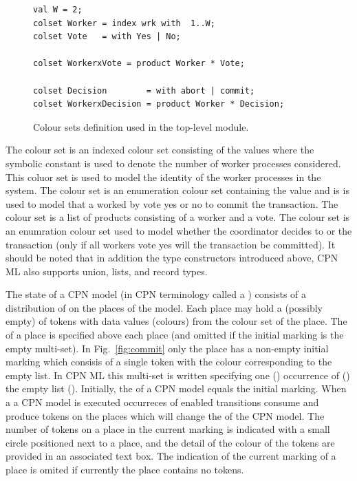 \begin{figure}
\begin{verbatim}
val W = 2;
colset Worker = index wrk with  1..W;
colset Vote   = with Yes | No;

colset WorkerxVote = product Worker * Vote;

colset Decision        = with abort | commit;
colset WorkerxDecision = product Worker * Decision;
\end{verbatim}
\caption{Colour sets definition used in the top-level module.}
\end{figure}

The  colour set is an indexed colour set consisting of
the values  where the symbolic
constant  is used to denote the number of worker processes
considered. This coluor set is used to model the identity of the
worker processes in the system. The colour set  is an
enumeration colour set containing the value  and
 is is used to model that a worked by vote yes or no to
commit the transaction. The colour set  is a list
of products consisting of a worker and a vote. The colour set
 is an enumration colour set used to model whether
the coordinator decides to  or  the
transaction (only if all workers vote yes will the transaction be
committed). It should be noted that in addition the type constructors
introduced above, CPN ML also supports union, lists, and record types.


The state of a CPN model (in CPN terminology called a
) consists of a distribution of  on
the places of the model. Each place may hold a (possibly empty)
 of tokens with data values (colours) from the
colour set of the place. The  of a place is
specified above each place (and omitted if the initial marking is the
empty multi-set). In Fig.~\ref{fig:commit} only the place
 has a non-empty initial marking which consisis of a
single token with the colour corresponding to the empty list. In CPN
ML this multi-set is written  specifying one
() occurrence of () the empty list
(\smlcode{[]}). Initially, the  of a CPN
model equals the initial marking. When a a CPN model is executed
occurreces of enabled transitions consume and produce tokens on the
places which will change the  of the CPN
model. The number of tokens on a place in the current marking is
indicated with a small circle positioned next to a place, and the
detail of the colour of the tokens are provided in an associated text
box. The indication of the current marking of a place is omited if
currently the place contains no tokens.
 
